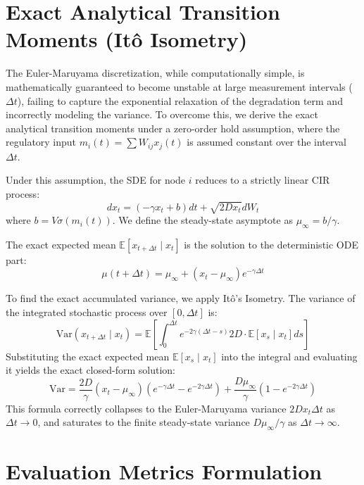 \documentclass[10pt, aps, rmp,  twocolumn, superscriptaddress, floatfix, showkeys]{revtex4-2}
\begin{document}
\section{Exact Analytical Transition Moments (Itô Isometry)}

The Euler-Maruyama discretization, while computationally simple, is mathematically guaranteed to become unstable at large measurement intervals ($\Delta t$), failing to capture the exponential relaxation of the degradation term and incorrectly modeling the variance. To overcome this, we derive the exact analytical transition moments under a zero-order hold assumption, where the regulatory input $m_i(t) = \sum W_{ij} x_j(t)$ is assumed constant over the interval $\Delta t$.

Under this assumption, the SDE for node $i$ reduces to a strictly linear CIR process:
\begin{equation}
    dx_t = (-\gamma x_t + b) dt + \sqrt{2D x_t} dW_t
\end{equation}
where $b = V \sigma(m_i(t))$. We define the steady-state asymptote as $\mu_\infty = b / \gamma$.

The exact expected mean $\mathbb{E}[x_{t+\Delta t} \mid x_t]$ is the solution to the deterministic ODE part:
\begin{equation}
    \mu(t+\Delta t) = \mu_\infty + (x_t - \mu_\infty)e^{-\gamma \Delta t}
\end{equation}

To find the exact accumulated variance, we apply Itô's Isometry. The variance of the integrated stochastic process over $[0, \Delta t]$ is:
\begin{equation}
    \text{Var}(x_{t+\Delta t} \mid x_t) = \mathbb{E}\left[ \int_0^{\Delta t} e^{-2\gamma(\Delta t - s)} 2D \cdot \mathbb{E}[x_s \mid x_t] ds \right]
\end{equation}
Substituting the exact expected mean $\mathbb{E}[x_s \mid x_t]$ into the integral and evaluating it yields the exact closed-form solution:
\begin{equation}
    \text{Var} = \frac{2D}{\gamma} (x_t - \mu_\infty) (e^{-\gamma \Delta t} - e^{-2\gamma \Delta t}) + \frac{D \mu_\infty}{\gamma} (1 - e^{-2\gamma \Delta t})
\end{equation}
This formula correctly collapses to the Euler-Maruyama variance $2D x_t \Delta t$ as $\Delta t \to 0$, and saturates to the finite steady-state variance $D \mu_\infty / \gamma$ as $\Delta t \to \infty$.

\section{Evaluation Metrics Formulation}
\end{document}
